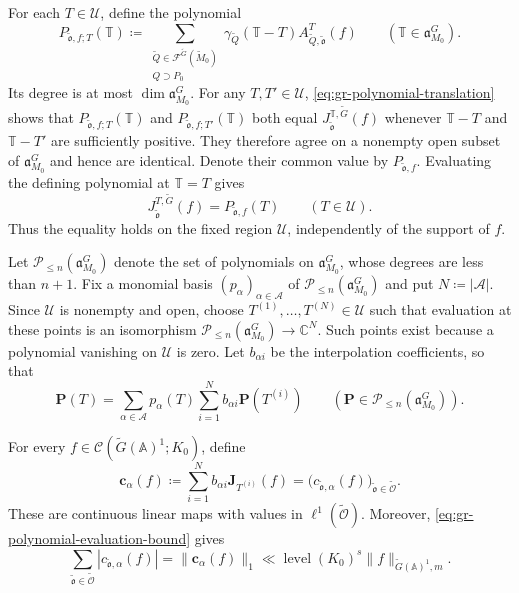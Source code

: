 \documentclass[12pt]{amsart}
\theoremstyle{definition}
\theoremstyle{plain}
\theoremstyle{remark}
\def\C{\mathbb{C}}%
\def\Q{\mathbb{Q}}%
\def\A{\mathbb{A}}%
\newcommand{\fa}{\mathfrak{a}}
\newcommand{\bT}{\mathbb{T}}
\newcommand{\cC}{\mathcal{C}}
\newcommand{\cF}{\mathcal{F}}
\newcommand{\cP}{\mathcal{P}}
\numberwithin{equation}{section}
\newcommand{\tG}{\widetilde{G}}
\newcommand{\tM}{\widetilde{M}}
\newcommand{\tQ}{\widetilde{Q}}
\newcommand{\tfo}{\widetilde{\mathfrak{o}}}
\newcommand{\tcO}{\widetilde{\mathcal{O}}}
\newcommand{\sU}{\mathscr{U}}
\newcommand{\level}{\operatorname{level}}
\begin{document}
For each $T\in\sU$, define the polynomial
\[
 P_{\tfo,f;T}(\bT)
 \coloneqq \sum_{\substack{\tQ\in\cF^{\tG}(\tM_0)\\Q\supset P_0}}
   \gamma_{\tQ}(\bT-T)A_{\tQ,\tfo}^{T}(f)
 \qquad(\bT\in \fa_{M_0}^G).
\]
Its degree is at most $\dim\fa_{M_0}^G$.
For any $T,T'\in\sU$, \eqref{eq:gr-polynomial-translation} shows that
$P_{\tfo,f;T}(\bT)$ and $P_{\tfo,f;T'}(\bT)$ both equal
$J_{\tfo}^{\bT,\tG}(f)$ whenever $\bT-T$ and $\bT-T'$ are sufficiently
positive. 
They therefore agree on a nonempty open subset of $\fa_{M_0}^G$
and hence are identical.
Denote their common value by $P_{\tfo,f}$.
Evaluating the defining polynomial at $\bT=T$ gives
\begin{equation}\label{eq:gr-polynomial-compact}
 J_{\tfo}^{T,\tG}(f)=P_{\tfo,f}(T)
 \qquad(T\in\sU).
\end{equation}
Thus the equality holds on the fixed region $\sU$,
independently of the support of $f$.

Let $\cP_{\le n}(\fa_{M_0}^G)$ denote the set of polynomials on $\fa_{M_0}^G$, whose degrees are less than $n+1$. 
Fix a monomial basis $(p_\alpha)_{\alpha\in\mathscr A}$ of
$\cP_{\le n}(\fa_{M_0}^G)$ and put $N\coloneqq |\mathscr A|$.
Since $\sU$ is nonempty and open, choose
$T^{(1)},\ldots,T^{(N)}\in\sU$ such that evaluation
at these points is an isomorphism
$\mathcal P_{\le n}(\fa_{M_0}^G)\longrightarrow\C^N$.
Such points exist because a polynomial vanishing on
$\mathscr U$ is zero.
Let $b_{\alpha i}$ be the interpolation coefficients, so that
\[
 \mathbf{P}(T)=\sum_{\alpha\in\mathscr A}p_\alpha(T)
       \sum_{i=1}^{N}b_{\alpha i}\mathbf{P}(T^{(i)})
 \qquad(\mathbf{P}\in\mathcal P_{\le n}(\fa_{M_0}^G)).
\]


For every $f\in\cC(\tG(\A)^1;K_0)$, define
\[
 \mathbf c_\alpha(f)
 \coloneqq\sum_{i=1}^{N}b_{\alpha i}\mathbf J_{T^{(i)}}(f)
 =\bigl(c_{\tfo,\alpha}(f)\bigr)_{\tfo\in\tcO}.
\]
These are continuous linear maps with values in $\ell^1(\tcO)$.
Moreover, \eqref{eq:gr-polynomial-evaluation-bound} gives
\begin{equation}\label{eq:gr-polynomial-coefficients}
 \sum_{\tfo\in\tcO}|c_{\tfo,\alpha}(f)|
 =\|\mathbf c_\alpha(f)\|_1  \ll   \level(K_0)^s\|f\|_{\tG(\A)^1,m}.
\end{equation}
\end{document}
